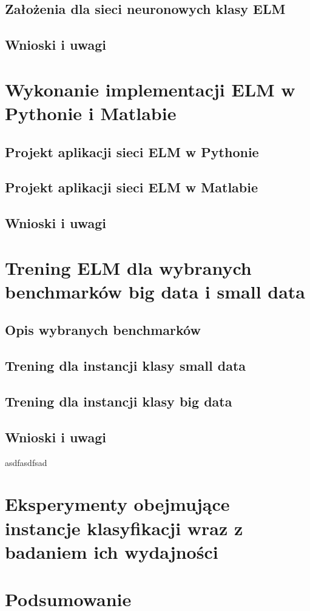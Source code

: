 \documentclass{article}
\begin{document}
\subsection{Założenia dla sieci neuronowych klasy ELM}
\subsection{Wnioski i uwagi}
\section{Wykonanie implementacji ELM w Pythonie i Matlabie}
\subsection{Projekt aplikacji sieci ELM w Pythonie}
\subsection{Projekt aplikacji sieci ELM w Matlabie}
\subsection{Wnioski i uwagi}
\section{Trening ELM dla wybranych benchmarków big data i small data}
\subsection{Opis wybranych benchmarków}
\subsection{Trening dla instancji klasy small data}
\subsection{Trening dla instancji klasy big data}
\subsection{Wnioski i uwagi}
asdfasdfsad
\section{Eksperymenty obejmujące instancje klasyfikacji wraz z badaniem ich wydajności}
\section*{Podsumowanie}
\end{document}
